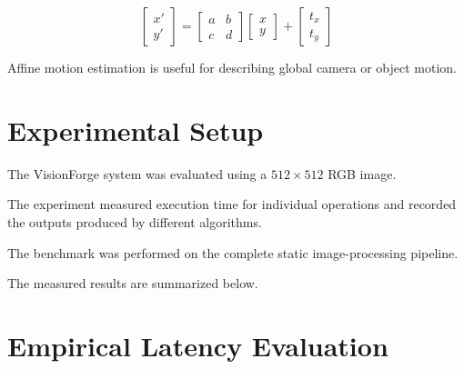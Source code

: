 \documentclass[11pt,a4paper]{article}
\begin{document}
\begin{equation}
\begin{bmatrix}
x'\\
y'
\end{bmatrix}
=
\begin{bmatrix}
a & b\\
c & d
\end{bmatrix}
\begin{bmatrix}
x\\
y
\end{bmatrix}
+
\begin{bmatrix}
t_x\\
t_y
\end{bmatrix}
\end{equation}

Affine motion estimation is useful for describing global camera or object motion.


\section{Experimental Setup}

The VisionForge system was evaluated using a $512\times512$ RGB image.

The experiment measured execution time for individual operations and recorded the outputs produced by different algorithms.

The benchmark was performed on the complete static image-processing pipeline.

The measured results are summarized below.


\section{Empirical Latency Evaluation}
\end{document}
